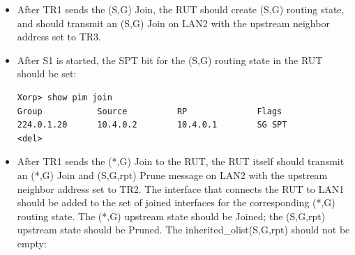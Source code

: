 \documentclass[11pt]{report}
\begin{document}

\begin{itemize}

  \item After TR1 sends the (S,G) Join, the RUT should create (S,G) routing
  state, and should transmit an (S,G) Join on LAN2 with the upstream neighbor
  address set to TR3.

  \item After S1 is started, the SPT bit for the (S,G) routing state in the
  RUT should be set:
\begin{verbatim}
Xorp> show pim join 
Group           Source          RP              Flags
224.0.1.20      10.4.0.2        10.4.0.1        SG SPT 
<del>
\end{verbatim}

  \item After TR1 sends the (*,G) Join to the RUT,
  the RUT itself should transmit an (*,G) Join and (S,G,rpt) Prune message on
  LAN2 with the upstream neighbor address set to TR2. The interface that
  connects the RUT to LAN1 should be added to the set of joined interfaces for
  the corresponding (*,G) routing state. The (*,G)
  upstream state should be Joined; the (S,G,rpt) upstream state should be
  Pruned. The inherited\_olist(S,G,rpt) should not be empty:


\end{itemize}
\end{document}

